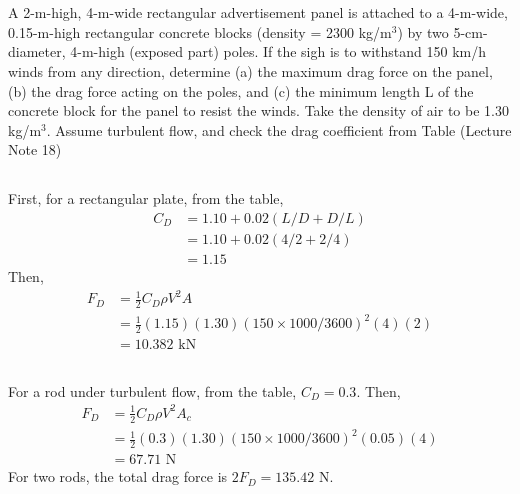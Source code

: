 \section{}

A 2-m-high, 4-m-wide rectangular advertisement panel is attached to a 4-m-wide, 0.15-m-high rectangular concrete blocks 
(density = 2300 kg/m$^3$) by two 5-cm-diameter, 4-m-high (exposed part) poles. If the sigh is to withstand 150 km/h winds
from any direction, determine (a) the maximum drag force on the panel, (b) the drag force acting on the poles, and (c) 
the minimum length L of the concrete block for the panel to resist the winds. Take the density of air to be 1.30 kg/m$^3$. 
Assume turbulent flow, and check the drag coefficient from Table (Lecture Note 18)

\subsection{}
First, for a rectangular plate, from the table,
\begin{align*}
    C_D &= 1.10 + 0.02(L/D + D/L) \\
        &= 1.10 + 0.02(4/2 + 2/4) \\
        &= 1.15
\end{align*}
Then, 
\begin{align*}
    F_D &= \frac{1}{2} C_D \rho V^2 A \\
        &= \frac{1}{2} (1.15) (1.30) (150 \times 1000/3600)^2 (4)(2) \\
        &= \boxed{10.382 \text{ kN}}
\end{align*}

\subsection{}
For a rod under turbulent flow, from the table, $C_D = 0.3$. Then,
\begin{align*}
    F_D &= \frac{1}{2} C_D \rho V^2 A_c \\
        &= \frac{1}{2} (0.3) (1.30) (150 \times 1000/3600)^2 (0.05)(4) \\
        &= \boxed{67.71 \text{ N}}
\end{align*}
For two rods, the total drag force is $\boxed{2F_D = 135.42\text{ N}}$.

